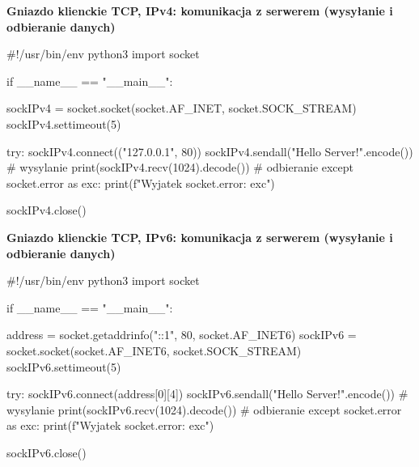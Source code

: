 \noindent \textbf{Gniazdo klienckie TCP, IPv4: komunikacja z serwerem (wysyłanie i odbieranie danych)}

\begin{code}
#!/usr/bin/env python3
import socket

if __name__ == "__main__":

    sockIPv4 = socket.socket(socket.AF_INET, socket.SOCK_STREAM)
    sockIPv4.settimeout(5)

    try:
        sockIPv4.connect(("127.0.0.1", 80))
        sockIPv4.sendall("Hello Server!".encode())	# wysylanie
        print(sockIPv4.recv(1024).decode())								# odbieranie
    except socket.error as exc:
        print(f"Wyjatek socket.error: {exc}")

    sockIPv4.close()
\end{code} 

\noindent \textbf{Gniazdo klienckie TCP, IPv6: komunikacja z serwerem (wysyłanie i odbieranie danych)}

\begin{code}
#!/usr/bin/env python3
import socket

if __name__ == "__main__":

    address = socket.getaddrinfo("::1", 80, socket.AF_INET6)
    sockIPv6 = socket.socket(socket.AF_INET6, socket.SOCK_STREAM)
    sockIPv6.settimeout(5)

    try:
        sockIPv6.connect(address[0][4])
        sockIPv6.sendall("Hello Server!".encode())	# wysylanie
        print(sockIPv6.recv(1024).decode())								# odbieranie
    except socket.error as exc:
        print(f"Wyjatek socket.error: {exc}")

    sockIPv6.close()
\end{code} 

